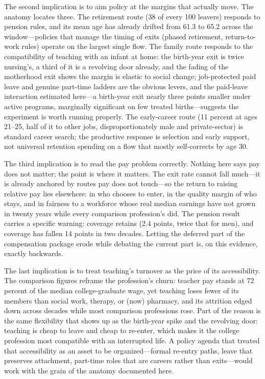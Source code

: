 \documentclass[11pt,a4paper]{article}
\begin{document}
The second implication is to aim policy at the margins that actually
move. The anatomy locates three. The
retirement route (38 of every 100 leavers) responds to pension rules,
and its mean age has already drifted from 61.3 to 65.2 across the
window---policies that manage the timing of exits (phased retirement,
return-to-work rules) operate on the largest single flow. The family
route responds to the compatibility of teaching with an infant at
home: the birth-year exit is twice nursing's, a third of it is a
revolving door already, and the fading of the motherhood exit shows
the margin is elastic to social change; job-protected paid leave and
genuine part-time ladders are the obvious levers, and the paid-leave
interaction estimated here---a birth-year exit nearly three points
smaller under active programs, marginally significant on few treated
births---suggests the experiment is worth running properly. The early-career route (11
percent at ages 21--25, half of it to other jobs, disproportionately
male and private-sector) is standard career search; the productive
response is selection and early support, not universal retention
spending on a flow that mostly self-corrects by age 30.

The third implication is to read the pay problem correctly. Nothing
here says pay does not matter; the point is where it matters. The exit rate cannot fall
much---it is already anchored by routes pay does not touch---so the
return to raising relative pay lies elsewhere: in who chooses to
enter, in the quality margin of who stays, and in fairness to a
workforce whose real median earnings have not grown in twenty years
while every comparison profession's did. The pension result carries a
specific warning: coverage retains (2.4 points, twice that for men),
and coverage has fallen 14 points in two decades. Letting the deferred
part of the compensation package erode while debating the current part
is, on this evidence, exactly backwards.

The last implication is to treat teaching's turnover as the price of
its accessibility. The comparison figures reframe the profession's
churn: teacher pay stands at 72 percent of the median college-graduate
wage, yet teaching loses fewer of its members than social work,
therapy, or (now) pharmacy, and its attrition edged down across
decades while most comparison professions rose. Part of the reason is the same flexibility that shows up as
the birth-year spike and the revolving door: teaching is cheap to
leave and cheap to re-enter, which makes it the college profession
most compatible with an interrupted life. A policy agenda that treated
that accessibility as an asset to be organized---formal re-entry
paths, leave that preserves attachment, part-time roles that are
careers rather than exits---would work with the grain of the anatomy
documented here.
\end{document}
